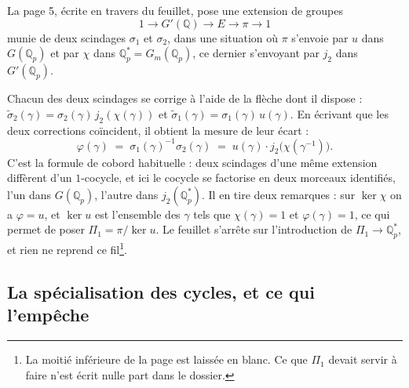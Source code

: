 \documentclass[11pt,a4paper]{article}
\begin{document}
La page 5, écrite en travers du feuillet, pose une extension de groupes
\[
  1 \longrightarrow G'(\mathbb{Q}) \longrightarrow E \longrightarrow \pi
  \longrightarrow 1
\]
munie de deux scindages $\sigma_{1}$ et $\sigma_{2}$, dans une situation où
$\pi$ s'envoie par $u$ dans $G(\mathbb{Q}_{p})$ et par $\chi$ dans
$\mathbb{Q}_{p}^{*} = G_{m}(\mathbb{Q}_{p})$, ce dernier s'envoyant par $j_{2}$
dans $G'(\mathbb{Q}_{p})$.


Chacun des deux scindages se corrige à l'aide de la flèche dont il dispose :
$\widetilde{\sigma}_{2}(\gamma) = \sigma_{2}(\gamma)\, j_{2}(\chi(\gamma))$ et
$\widetilde{\sigma}_{1}(\gamma) = \sigma_{1}(\gamma)\, u(\gamma)$. En écrivant
que les deux corrections coïncident, il obtient la mesure de leur écart :
\[
  \varphi(\gamma) \;=\; \sigma_{1}(\gamma)^{-1} \sigma_{2}(\gamma)
  \;=\; u(\gamma) \cdot j_{2}\bigl(\chi(\gamma^{-1})\bigr) .
\]
C'est la formule de cobord habituelle : deux scindages d'une même extension
diffèrent d'un $1$-cocycle, et ici le cocycle se factorise en deux morceaux
identifiés, l'un dans $G(\mathbb{Q}_{p})$, l'autre dans
$j_{2}(\mathbb{Q}_{p}^{*})$. Il en tire deux remarques : sur $\ker \chi$ on a
$\varphi = u$, et $\ker u$ est l'ensemble des $\gamma$ tels que
$\chi(\gamma) = 1$ et $\varphi(\gamma) = 1$, ce qui permet de poser
$\Pi_{1} = \pi/\ker u$. Le feuillet s'arrête sur l'introduction de
$\Pi_{1} \to \mathbb{Q}_{p}^{*}$, et rien ne reprend ce fil\footnote{La moitié
inférieure de la page est laissée en blanc. Ce que $\Pi_{1}$ devait servir à
faire n'est écrit nulle part dans le dossier.}.

\subsection*{La spécialisation des cycles, et ce qui l'empêche}
\end{document}
